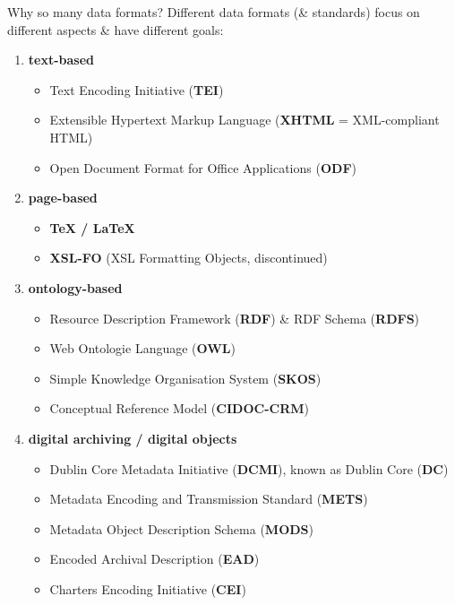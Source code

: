 \begin{frame}{Why so many data formats?}
\small
Different data formats (\& standards) focus on different aspects \& have different goals:
\begin{enumerate}
\item \textbf{text-based}
	\begin{itemize}\scriptsize
	\item Text Encoding Initiative (\textbf{TEI})
	\item Extensible Hypertext Markup Language (\textbf{XHTML} = XML-compliant HTML)
	\item Open Document Format for Office Applications (\textbf{ODF})
	\end{itemize}
\item \textbf{page-based}
	\begin{itemize}\footnotesize
	\item \textbf{\TeX{} / \LaTeX{}}
	\item \textbf{XSL-FO} (XSL Formatting Objects, discontinued)
	\end{itemize}
\item \textbf{ontology-based}
	\begin{itemize}\scriptsize
	\item Resource Description Framework (\textbf{RDF}) \& RDF Schema (\textbf{RDFS})
	\item Web Ontologie Language (\textbf{OWL})
	\item Simple Knowledge Organisation System (\textbf{SKOS})
	\item Conceptual Reference Model (\textbf{CIDOC-CRM})
	\end{itemize}
\item \textbf{digital archiving / digital objects}
	\begin{itemize}\scriptsize
	\item Dublin Core Metadata Initiative (\textbf{DCMI}), known as Dublin Core (\textbf{DC})
	\item Metadata Encoding and Transmission Standard (\textbf{METS})
	\item Metadata Object Description Schema (\textbf{MODS})
	\item Encoded Archival Description (\textbf{EAD})
	\item Charters Encoding Initiative (\textbf{CEI})
	\end{itemize}
\end{enumerate}

\end{frame}

